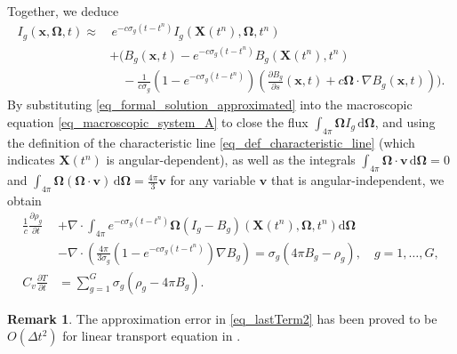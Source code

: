\documentclass[preprint,12pt]{elsarticle}
\theoremstyle{definition}
\newtheorem{remark}{Remark}[section]
\theoremstyle{plain}
\numberwithin{equation}{section}
\numberwithin{algorithm}{section}
\newcounter{eq_count}
\newcounter{subeq_count}
\newcommand{\vOmega}{\mathbf{\Omega}}
\newcommand{\vx}{\mathbf{x}}
\newcommand{\mfx}{{\mathbf{X}}}
\newcommand{\dd}{{\text{d}}}
\newcommand{\pdrv}[2]{\frac{\partial{#1}}{\partial{#2}}}
\begin{document}
Together, we deduce
     \begin{equation}\label{eq_formal_solution_approximated}
		\begin{aligned}
		  I_g( \vx, \vOmega,t)
            \approx & \,e^{- c  \sigma_g (t - t^n )} I_{g}( \mfx(t^n), \vOmega, t^n ) 
            \\
            & + \Bigg( B_g(\vx,t)  - e^{- c  \sigma_g (t - t^n )}
            B_g( \mfx(t^n),t^n )  \\ 
			& \quad  -  \frac{1}{c\sigma_g} (1 -  e^{- c \sigma_g (t - t^{n} ) } )  \left( \pdrv{B_g}{s}(\vx,t) +  c \vOmega \cdot \nabla B_g(\vx,t)  \right)   \Bigg).
		\end{aligned}
    \end{equation}
     By substituting \eqref{eq_formal_solution_approximated} into the macroscopic equation \eqref{eq_macroscopic_system_A} to close the flux
$\int_{4\pi} \vOmega I_g \,\mathrm{d}\vOmega$, 
and using the definition of the characteristic line \eqref{eq_def_characteristic_line} (which indicates $\mfx(t^n)$ is angular-dependent), as well as the integrals 
$\int_{4\pi} \vOmega \cdot \mathbf{v} \,\mathrm{d}\vOmega  = 0$ and $\int_{4\pi} \vOmega (\vOmega \cdot \mathbf{v}) \,\mathrm{d}\vOmega = \frac{4\pi}{3}\mathbf{v} $ for any variable  $\mathbf{v} $ that is angular-independent, 
we obtain 
\begin{subequations} \label{eq_approximaed_nonModifed}
		\begin{align}
			\frac{1}{c} \frac{\partial \rho_g}{\partial t}&+\nabla \cdot\int_{4 \pi}  e^{- c  \sigma_g (t - t^n )} \vOmega   \left( I_{g}  - B_{g} \right) ( \mfx(t^n), \vOmega,t^n ) \dd{\vOmega} 
            \\ \nonumber
		  & - \nabla \cdot \left( \frac{4 \pi }{3\sigma_{g}}\left(1-e^{-c \sigma_{g}\left(t-t^n\right)}\right) \nabla B_g \right)=  \sigma_{g} ( 4 \pi B_g-\rho_g ),  \quad g=1,\ldots,G, 
            \\  
		  C_v \pdrv{T}{t}&=\sum_{g=1}^{G} \sigma_{g} \left( \rho_g- 4 \pi  B_g\right) .
		\end{align}
    \end{subequations} 
    
\begin{remark}
    The approximation error in \eqref{eq_lastTerm2} has been proved to be $O(\Delta t^2)$ for linear transport equation in \cite{zhang2023asymptotic,cai2024asymptotic}.
\end{remark}
\end{document}
